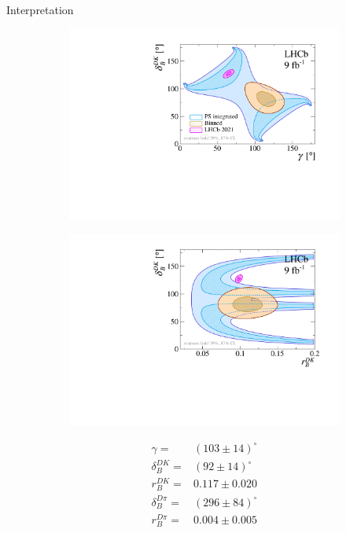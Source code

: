 \documentclass{beamer}
\begin{document}
\begin{frame}{Interpretation}
  \begin{figure}
    \centering
    \begin{subfigure}{0.50\textwidth}
      \includegraphics[width = 1.0\textwidth]{Plots/gammacharm_lhcb_KKpipi_GLW_KKpipi_GGSZ_lhcb_2020_beauty_and_charm_g_d_dk.pdf}
    \end{subfigure}%
    \begin{subfigure}{0.50\textwidth}
      \includegraphics[width = 1.0\textwidth]{Plots/gammacharm_lhcb_KKpipi_GLW_KKpipi_GGSZ_lhcb_2020_beauty_and_charm_r_dk_d_dk.pdf}
    \end{subfigure}
  \end{figure}
  \vspace{-0.75cm}
  \begin{align*}
    \gamma =& (103\pm14)^\circ \\
    \delta_B^{DK} =& (92\pm14)^\circ \\
    r_B^{DK} =& 0.117\pm0.020 \\
    \delta_B^{D\pi} =& (296\pm84)^\circ \\
    r_B^{D\pi} =& 0.004\pm0.005
  \end{align*}
\end{frame}
\end{document}
